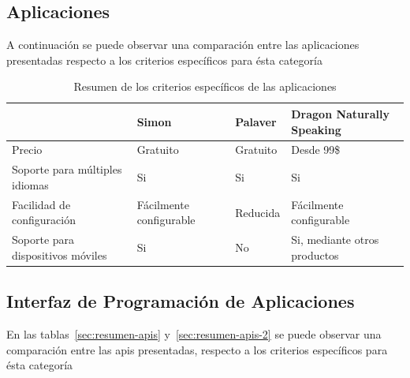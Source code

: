 \subsection{Aplicaciones}

A continuaci\'on se puede observar una comparaci\'on entre las aplicaciones presentadas respecto a los criterios espec\'ificos
para \'esta categor\'ia


\begin{table}[H]
\centering
\footnotesize
\begin{tabular}{|p{3.5cm}|p{3.5cm}|p{3.5cm}|p{3.5cm}|}
\hline
                                      &  Simon                                                       &  Palaver                                       & Dragon Naturally Speaking \\
\hline
Precio                                & Gratuito                                                     & Gratuito                                       & Desde 99\$  \\ \hline
Soporte para m\'ultiples idiomas      & Si                                                           & Si                                             & Si \\ \hline
Facilidad de configuraci\'on          & F\'acilmente configurable                                    & Reducida                                       & F\'acilmente configurable \\ \hline
Soporte para dispositivos m\'oviles   & Si                                                           & No                                             & Si, mediante otros productos \\
\hline
\end{tabular}
\caption{Resumen de los criterios espec\'ificos de las aplicaciones}
\label{sec:resumen-aplicaciones}
\end{table}

\subsection{Interfaz de Programaci\'on de Aplicaciones}

En las tablas~\ref{sec:resumen-apis} y~\ref{sec:resumen-apis-2} se puede observar una comparaci\'on entre las \gls{api}s presentadas, respecto a los criterios espec\'ificos
para \'esta categor\'ia


